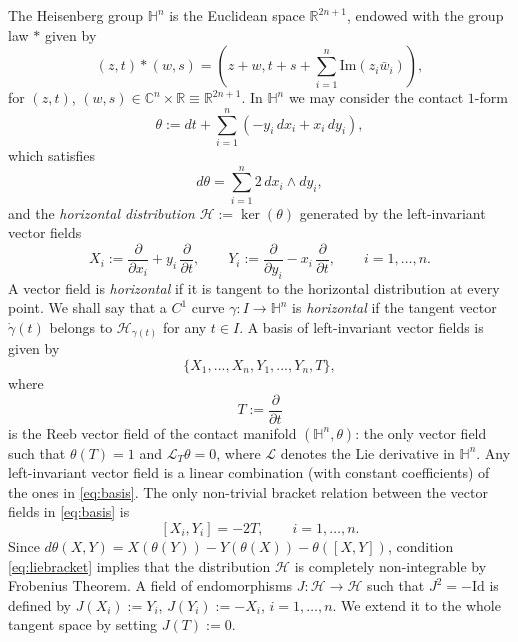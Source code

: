 \documentclass[10pt]{amsart}
\theoremstyle{definition}
\theoremstyle{remark}
\numberwithin{equation}{section}
\begin{document}
The Heisenberg group ${{\mathbb{H}}}^n$ is the Euclidean space ${{\mathbb{R}}}^{2n+1}$, endowed with the group law $*$ given by
\[
(z,t)*(w,s)=(z+w, t+s+\sum_{i=1}^n \text{Im}(z_i\bar{w}_i)),
\]
for $(z,t)$, $(w,s)\in{{\mathbb{C}}}^n\times{{\mathbb{R}}}\equiv{{\mathbb{R}}}^{2n+1}$. In ${{\mathbb{H}}}^n$ we may consider the contact $1$-form
\[
\theta:=dt+\sum_{i=1}^n (-y_{i}\,dx_{i}+x_{i}\,dy_{i}),
\]
which satisfies
\[
d\theta=\sum_{i=1}^n2\,dx_{i}\wedge dy_{i},
\]
and the \emph{horizontal distribution} ${\mathcal{H}}:=\ker(\theta)$ generated by the left-invariant vector fields
\[
X_{i}:=\frac{\partial}{{\partial} x_{i}}+y_{i}\,\frac{\partial}{{\partial} t}, \qquad
Y_{i}:=\frac{\partial}{{\partial} y_{i}}-x_{i}\,\frac{\partial}{{\partial} t}, \qquad
i=1,\ldots,n.
\]
A vector field is \emph{horizontal} if it is tangent to the horizontal distribution at every point. We shall say that a $C^1$ curve ${\gamma}:I\to{{\mathbb{H}}}^n$ is \emph{horizontal} if the tangent vector $\dot{\gamma}(t)$ belongs to ${\mathcal{H}}_{{\gamma}(t)}$ for any $t\in I$. A basis of left-invariant vector fields is given by
\begin{equation}
\label{eq:basis}
\{X_1,...,X_n,Y_1,...,Y_n,T\},
\end{equation}
where
\[
T:=\frac{\partial}{{\partial} t}
\]
is the Reeb vector field of the contact manifold $({{\mathbb{H}}}^n,\theta)$: the only vector field such that $\theta(T)=1$ and $\mathcal{L}_T\theta=0$, where $\mathcal{L}$ denotes the Lie derivative in ${{\mathbb{H}}}^n$. Any left-invariant vector field is a linear combination (with constant coefficients) of the ones in \eqref{eq:basis}. The only non-trivial bracket relation between the vector fields in \eqref{eq:basis} is
\begin{equation}
\label{eq:liebracket}
[X_i,Y_i]=-2T, \qquad i=1,\ldots,n.
\end{equation}
Since $d\theta(X,Y)=X(\theta(Y))-Y(\theta(X))-\theta([X,Y])$, condition \eqref{eq:liebracket} implies that the distribution ${\mathcal{H}}$ is completely non-integrable by Frobenius Theorem. A field of endomorphisms $J:{\mathcal{H}}\to{\mathcal{H}}$ such that $J^2=-\text{Id}$ is defined by $J(X_i):=Y_i$, $J(Y_i):=-X_i$, $i=1,\ldots,n$. We extend it to the whole tangent space by setting $J(T):=0$.
\end{document}
